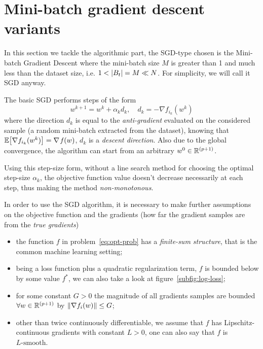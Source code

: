 \section{Mini-batch gradient descent variants}

In this section we tackle the algorithmic part, the SGD-type chosen is the Mini-batch Gradient Descent where the mini-batch size $M$ is greater than 1 and much less than the dataset size, i.e. $1<\lvert B_t\rvert=M\ll N$. For simplicity, we will call it SGD anyway.

The basic SGD performs steps of the form
\begin{equation}\label{eq:sgd_step}
w^{k+1}=w^k+\alpha_kd_k,\quad d_k=-\nabla f_{i_k}(w^k)
\end{equation}
where the direction $d_k$ is equal to the \emph{anti-gradient} evaluated on the considered sample (a random mini-batch extracted from the dataset), knowing that $\mathbb{E}\bigl[\nabla f_{i_k}(w^k)\bigr]=\nabla\operatorname*{\mathit{f}}(w)$, $d_k$ is a \emph{descent direction}. Also due to the global convergence, the algorithm can start from an arbitrary $w^0\in\mathbb{R}^{(p+1)}$.

Using this step-size form, without a line search method for choosing the optimal step-size $\alpha_k$, the objective function value doesn't decrease necessarily at each step, thus making the method \emph{non-monotonous}.

In order to use the SGD algorithm, it is necessary to make further assumptions on the objective function and the gradients (how far the gradient samples are from the \emph{true gradients})
\begin{itemize}
\item the function $f$ in problem~\eqref{eq:opt-prob} has a \emph{finite-sum structure}, that is the common machine learning setting;
\item being a loss function plus a quadratic regularization term, $f$ is bounded below by some value $f^\ast$, we can also take a look at figure~\ref{subfig:log-loss};
\item for some constant $G>0$ the magnitude of all gradients samples are bounded $\forall w\in\mathbb{R}^{(p+1)}$ by $\lVert\nabla f_i(w)\rVert\leq G$;
\item other than twice continuously differentiable, we assume that $f$ has Lipschitz-continuous gradients with constant $L>0$, one can also say that $f$ is $L\text{-smooth}$.
\end{itemize}

